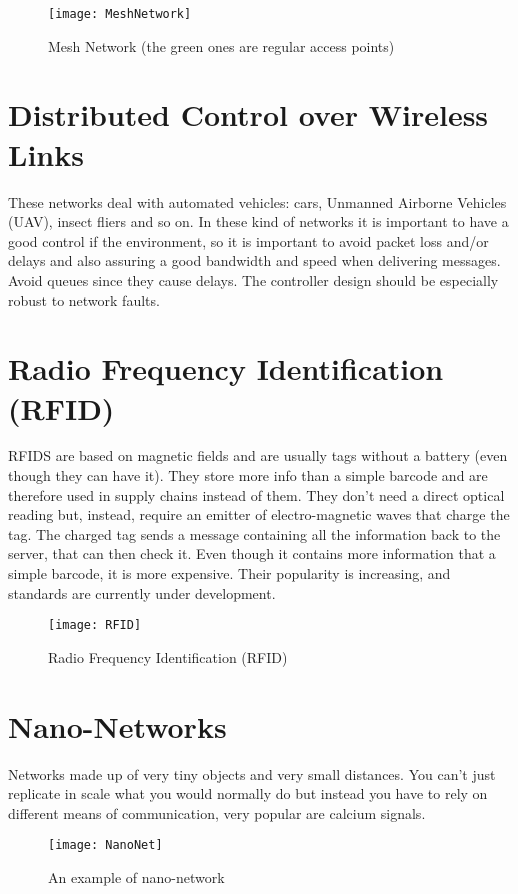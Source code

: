 \begin{figure}[!h]
  \centering
  \texttt{[image: MeshNetwork]}
  \caption{Mesh Network (the green ones are regular access 
    points)}
  \label{fig:mn:MeshNetwork}
\end{figure}	

\section{Distributed Control over Wireless Links}
These networks deal with automated vehicles: cars, Unmanned Airborne 
Vehicles (UAV), insect fliers and so on.
In these kind of networks it is important to have a good control if the 
environment, so it is important to avoid packet loss and/or delays and also 
assuring a good bandwidth and speed when delivering messages. Avoid queues since 
they cause delays.
The controller design should be especially robust to network faults.

\section{Radio Frequency Identification (RFID)}
RFIDS are based on magnetic fields and are usually tags without a 
battery (even though they can have it). They store more info than a simple 
barcode and are therefore used in supply chains instead of them. They don't 
need a direct optical reading but, instead, require an emitter of 
electro-magnetic waves that charge the tag. The charged tag sends a message 
containing all the information back to the server, that can then check it.
Even though it contains more information that a simple barcode, it is 
more expensive. Their popularity is increasing, and standards are currently 
under development.

\begin{figure}[t]
  \centering
  \texttt{[image: RFID]}
  \caption{Radio Frequency Identification (RFID)}
  \label{fig:ewn:RFID}
\end{figure}

\section{Nano-Networks}
Networks made up of very tiny objects and very small distances. You 
can't just replicate in scale what you would normally do  but instead you have 
to rely on different means of communication, very popular are calcium signals.

\begin{figure}[t]
  \centering
  \texttt{[image: NanoNet]}
  \caption{An example of nano-network}				
  \label{fig:ewn:NanoNet}
\end{figure}
